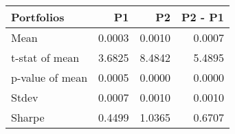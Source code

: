 \begin{tabular}{lrrr}
\toprule
Portfolios & P1 & P2 & P2 - P1 \\
\midrule
Mean & 0.0003 & 0.0010 & 0.0007 \\
t-stat of mean & 3.6825 & 8.4842 & 5.4895 \\
p-value of mean & 0.0005 & 0.0000 & 0.0000 \\
Stdev & 0.0007 & 0.0010 & 0.0010 \\
Sharpe & 0.4499 & 1.0365 & 0.6707 \\
\bottomrule
\end{tabular}
